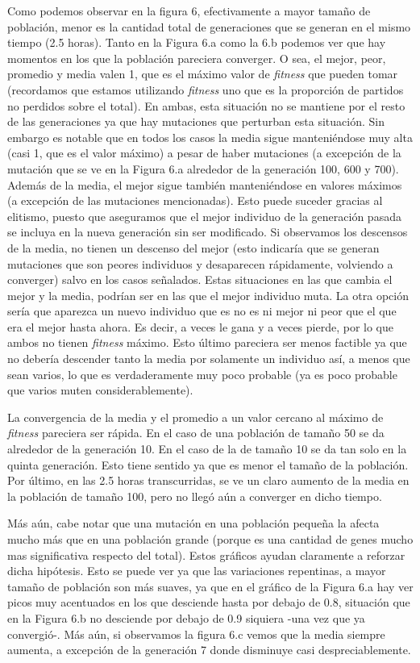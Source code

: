\documentclass[A4paper,oneside,fleqn,11pt]{article}
\theoremstyle{definition}
\begin{document}
Como podemos observar en la figura 6, efectivamente a mayor tamaño de población, menor es la cantidad total de generaciones que se generan en el mismo tiempo (2.5 horas). Tanto en la Figura 6.a como la 6.b podemos ver que hay momentos en los que la población pareciera converger. O sea, el mejor, peor, promedio y media valen 1, que es el máximo valor de \textit{fitness} que pueden tomar (recordamos que estamos utilizando \textit{fitness} uno que es la proporción de partidos no perdidos sobre el total). En ambas, esta situación no se mantiene por el resto de las generaciones ya que hay mutaciones que perturban esta situación. Sin embargo es notable que en todos los casos la media sigue manteniéndose muy alta (casi 1, que es el valor máximo) a pesar de haber mutaciones (a excepción de la mutación que se ve en la Figura 6.a alrededor de la generación  100, 600 y 700). Además de la media, el mejor sigue también manteniéndose en valores máximos (a excepción de las mutaciones mencionadas). Esto puede suceder gracias al elitismo, puesto que aseguramos que el mejor individuo de la generación pasada se incluya en la nueva generación sin ser modificado. Si observamos los descensos de la media, no tienen un descenso del mejor (esto indicaría que se generan mutaciones que son peores individuos y desaparecen rápidamente, volviendo a converger) salvo en los casos señalados. Estas situaciones en las que cambia el mejor y la media, podrían ser en las que el mejor individuo muta. La otra opción sería que aparezca un nuevo individuo que es no es ni mejor ni peor que el que era el mejor hasta ahora. Es decir, a veces le gana y a veces pierde, por lo que ambos no tienen \textit{fitness} máximo. Esto último pareciera ser menos factible ya que no debería descender tanto la media por solamente un individuo así, a menos que sean varios, lo que es verdaderamente muy poco probable (ya es poco probable que varios muten considerablemente).

La convergencia de la media y el promedio a un valor cercano al máximo de \textit{fitness} pareciera ser rápida. En el caso de una población de tamaño 50 se da alrededor de la generación 10. En el caso de la de tamaño 10 se da tan solo en la quinta generación. Esto tiene sentido ya que es menor el tamaño de la población. Por último, en las 2.5 horas transcurridas, se ve un claro aumento de la media en la población de tamaño 100, pero no llegó aún a converger en dicho tiempo.

Más aún, cabe notar que una mutación en una población pequeña la afecta mucho más que en una población grande (porque es una cantidad de genes mucho mas significativa respecto del total). Estos gráficos ayudan claramente a reforzar dicha hipótesis. Esto se puede ver ya que las variaciones repentinas, a mayor tamaño de población son más suaves, ya que en el gráfico de la Figura 6.a hay ver picos muy acentuados en los que desciende hasta por debajo de 0.8, situación que en la Figura 6.b no desciende por debajo de 0.9 siquiera -una vez que ya convergió-. Más aún, si observamos la figura 6.c vemos que la media siempre aumenta, a excepción de la generación 7 donde disminuye casi despreciablemente. 
\end{document}

